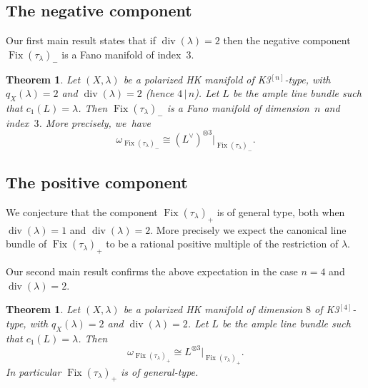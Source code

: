 \documentclass[JEP,XML,SOM,Unicode,published]{cedram}
\newcommand{\HK}{\textup{HK}\xspace}
\DeclareMathOperator{\divisore}{div}\let\div\divisore
\DeclareMathOperator{\Fix}{Fix}
\newtheorem{theo}[lemm]{Theorem}
\theoremstyle{definition}
\begin{document}
\subsection{The negative component}\label{subsec:Fano}

Our first main result states that if $\divisore(\lambda)=2$ then the negative component $\Fix(\tau_{\lambda})_-$ is a Fano manifold of index~3.

\begin{theo}\label{thm:main1}
Let $(X,\lambda)$ be a polarized \HK manifold of \textup{K3}$^{[n]}$-type, with $q_X(\lambda)=2$ and $\divisore(\lambda)=2$ (hence $4\,|\,n$).
Let $L$ be the ample line bundle such that $c_1(L)=\lambda$.
Then $\Fix(\tau_{\lambda})_-$ is a Fano manifold of dimension~$n$ and index~$3$. More precisely, we~have
\begin{equation}\label{canmenotre}
\omega_{\Fix(\tau_{\lambda})_-}\cong (L^{\vee})^{\otimes 3} \vert_{\Fix(\tau_{\lambda})_-}.
\end{equation}
\end{theo}

\subsection{The positive component}\label{subsec:LehnQuestion}

We conjecture that the component $\Fix(\tau_{\lambda})_+$ is of general type, both when $\divisore(\lambda)=1$ and $\divisore(\lambda)=2$.
More precisely we expect the canonical line bundle of $\Fix(\tau_{\lambda})_+$ to be a rational positive multiple of the restriction of $\lambda$.

Our second main result confirms the above expectation in the case $n=4$ and $\divisore(\lambda)=2$.

\begin{theo}\label{thm:main2}
Let $(X,\lambda)$ be a polarized \HK manifold of dimension $8$ of \textup{K3}$^{[4]}$-type, with $q_X(\lambda)=2$ and $\divisore(\lambda)=2$. Let $L$ be the ample line bundle such that $c_1(L)=\lambda$.
Then
\[
\omega_{\Fix(\tau_{\lambda})_+}\cong L^{\otimes 3}\vert_{\Fix(\tau_{\lambda})_+}.
\]
In particular $\Fix(\tau_{\lambda})_+$ is of general-type.
\end{theo}
\end{document}
